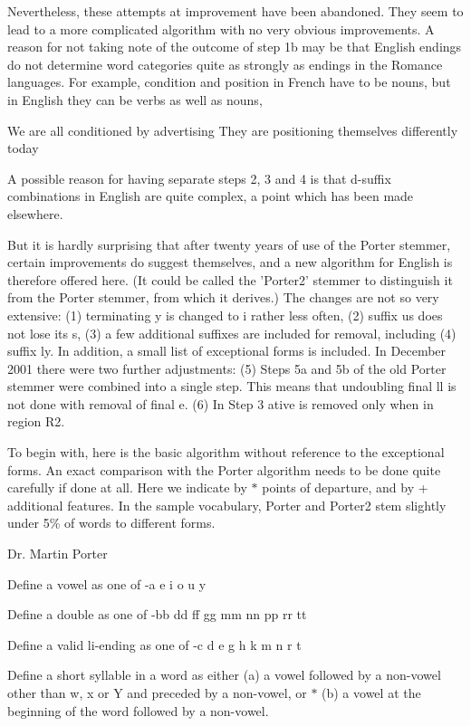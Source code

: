 Nevertheless, these attempts at improvement have been abandoned. They seem to lead to a more complicated algorithm with no very obvious improvements. A reason for not taking note of the outcome of step 1b may be that English endings do not determine word categories quite as strongly as endings in the Romance languages. For example, condition and position in French have to be nouns, but in English they can be verbs as well as nouns,

We are all conditioned by advertising They are positioning themselves differently today

A possible reason for having separate steps 2, 3 and 4 is that d-\/suffix combinations in English are quite complex, a point which has been made elsewhere.

But it is hardly surprising that after twenty years of use of the Porter stemmer, certain improvements do suggest themselves, and a new algorithm for English is therefore offered here. (It could be called the 'Porter2' stemmer to distinguish it from the Porter stemmer, from which it derives.) The changes are not so very extensive\+: (1) terminating y is changed to i rather less often, (2) suffix us does not lose its s, (3) a few additional suffixes are included for removal, including (4) suffix ly. In addition, a small list of exceptional forms is included. In December 2001 there were two further adjustments\+: (5) Steps 5a and 5b of the old Porter stemmer were combined into a single step. This means that undoubling final ll is not done with removal of final e. (6) In Step 3 ative is removed only when in region R2.

To begin with, here is the basic algorithm without reference to the exceptional forms. An exact comparison with the Porter algorithm needs to be done quite carefully if done at all. Here we indicate by $\ast$ points of departure, and by + additional features. In the sample vocabulary, Porter and Porter2 stem slightly under 5\% of words to different forms.

Dr. Martin Porter

Define a vowel as one of -\/a e i o u y

Define a double as one of -\/bb dd ff gg mm nn pp rr tt

Define a valid li-\/ending as one of -\/c d e g h k m n r t

Define a short syllable in a word as either (a) a vowel followed by a non-\/vowel other than w, x or Y and preceded by a non-\/vowel, or $\ast$ (b) a vowel at the beginning of the word followed by a non-\/vowel.

